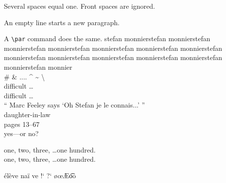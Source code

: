 \documentclass[11pt,oneside,a4paper]{article}
\begin{document}


Several spaces    equal one.
      Front spaces are ignored.

An empty line starts a new paragraph. \par
A \verb|\par| command does the same.
stefan monnierstefan monnierstefan monnierstefan monnierstefan monnierstefan monnierstefan monnierstefan monnierstefan monnierstefan monnierstefan monnierstefan monnierstefan monnierstefan monnier \\

\# \& .... \^{} \~{} \textbackslash \\

difficult \ldots \\
dif{}f{}icult \ldots \\


`` Marc Feeley says `Oh Stefan je le connais...' ''\\

daughter-in-law\\        
pages 13--67 \\
yes---or no?

one, two, three, \dots one hundred.\\
one, two, three, \ldots one hundred.

\'el\`eve na\"i ve !` ?` \o \oe \AE \t{oo} \textregistered \texttrademark\\
\end{document}
